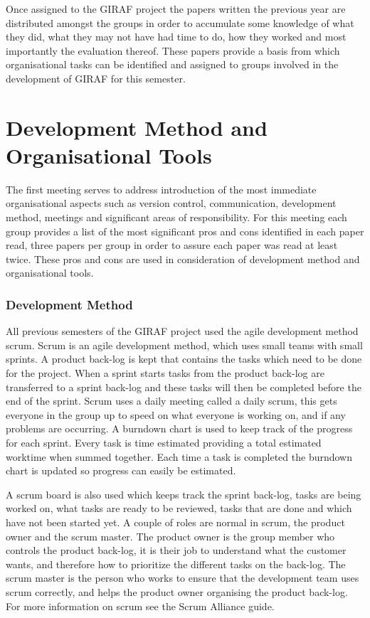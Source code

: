 Once assigned to the GIRAF project the papers written the previous year are distributed amongst the groups in order to accumulate some knowledge of what they did, what they may not have had time to do,  how they worked and most importantly the evaluation thereof.
These papers provide a basis from which organisational tasks can be identified and assigned to groups involved in the development of GIRAF for this semester.

\section{Development Method and Organisational Tools}
The first meeting serves to address introduction of the most immediate organisational aspects such as version control, communication, development method, meetings and significant areas of responsibility.
For this meeting each group provides a list of the most significant pros and cons identified in each paper read, three papers per group in order to assure each paper was read at least twice.
These pros and cons are used in consideration of development method and organisational tools.

\subsubsection*{Development Method}
All previous semesters of the GIRAF project used the agile development method scrum.
Scrum is an agile development method, which uses small teams with small sprints. 
A product back-log is kept that contains the tasks which need to be done for the project. 
When a sprint starts tasks from the product back-log are transferred to a sprint back-log and these tasks will then be completed before the end of the sprint.
Scrum uses a daily meeting called a daily scrum, this gets everyone in the group up to speed on what everyone is working on, and if any problems are occurring. 
A burndown chart is used to keep track of the progress for each sprint. 
Every task is time estimated providing a total estimated worktime when summed together. 
Each time a task is completed the burndown chart is updated so progress can easily be estimated.

A scrum board is also used which keeps track the sprint back-log, tasks are being worked on, what tasks are ready to be reviewed, tasks that are done and which have not been started yet.
A couple of roles are normal in scrum, the product owner and the scrum master.
The product owner is the group member who controls the product back-log, it is their job to understand what the customer wants, and therefore how to prioritize the different tasks on the back-log.
The scrum master is the person who works to ensure that the development team uses scrum correctly, and helps the product owner organising the product back-log.
For more information on scrum see the Scrum Alliance guide. \cite{scrum}

